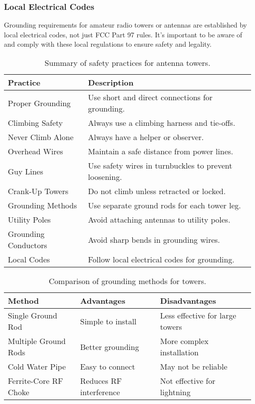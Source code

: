\subsubsection*{Local Electrical Codes}
Grounding requirements for amateur radio towers or antennas are established by local electrical codes, not just FCC Part 97 rules. It’s important to be aware of and comply with these local regulations to ensure safety and legality.

\begin{table}[h]
\centering
\caption{Summary of safety practices for antenna towers.}
\label{tab:safety-practices}
\begin{tabular}{|l|l|}
\hline
\textbf{Practice} & \textbf{Description} \\
\hline
Proper Grounding & Use short and direct connections for grounding. \\
Climbing Safety & Always use a climbing harness and tie-offs. \\
Never Climb Alone & Always have a helper or observer. \\
Overhead Wires & Maintain a safe distance from power lines. \\
Guy Lines & Use safety wires in turnbuckles to prevent loosening. \\
Crank-Up Towers & Do not climb unless retracted or locked. \\
Grounding Methods & Use separate ground rods for each tower leg. \\
Utility Poles & Avoid attaching antennas to utility poles. \\
Grounding Conductors & Avoid sharp bends in grounding wires. \\
Local Codes & Follow local electrical codes for grounding. \\
\hline
\end{tabular}
\end{table}

\begin{table}[h]
\centering
\caption{Comparison of grounding methods for towers.}
\label{tab:grounding-methods}
\begin{tabular}{|l|l|l|}
\hline
\textbf{Method} & \textbf{Advantages} & \textbf{Disadvantages} \\
\hline
Single Ground Rod & Simple to install & Less effective for large towers \\
Multiple Ground Rods & Better grounding & More complex installation \\
Cold Water Pipe & Easy to connect & May not be reliable \\
Ferrite-Core RF Choke & Reduces RF interference & Not effective for lightning \\
\hline
\end{tabular}
\end{table}

